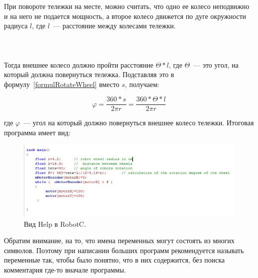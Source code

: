 При повороте тележки на месте, можно считать, что одно ее колесо неподвижно и на него не подается мощность, а второе колесо движется по дуге окружности радиуса \(l\), где \(l\)~--- расстояние между колесами тележки.\\\\

\\\\

Тогда внешнее колесо должно пройти расстояние \(\Theta*l\), где \(\Theta\)~--- это угол, на который должна повернуться тележка. Подставляя это в формулу~\ref{formulRotateWheel} вместо \(s\), получаем:

\begin{equation}
\varphi=\frac{360*s}{2\pi r}=\frac{360*\Theta*l}{2\pi r}
\label{formulRotateWheel}
\end{equation}

где \(\varphi\)~--- угол на который должно повернуться внешнее колесо тележки. Итоговая программа имеет вид:

\begin{figure}[h!]
	\begin{center}
		\includegraphics[width=1\linewidth]{chapters/chapter11/images/3}
		\caption{Вид Help в RobotC.}
		\label{ris:image11x3}
	\end{center}
\end{figure}

Обратим внимание, на то, что имена переменных могут состоять из многих символов. Поэтому при написании больших программ рекомендуется называть переменные так, чтобы было понятно, что в них содержится, без поиска комментария где-то вначале программы.